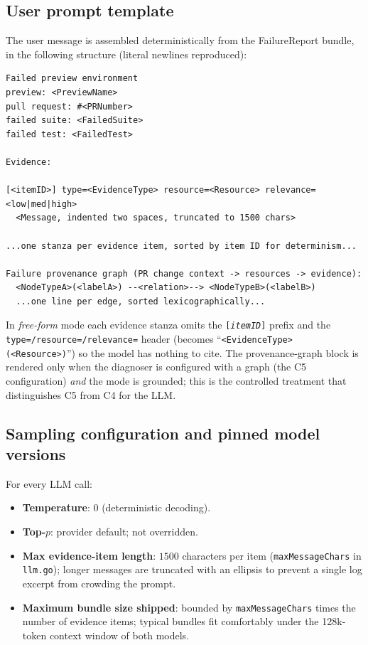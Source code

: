 \documentclass[sigconf, nonacm=true, anonymous=false, review=false]{acmart}
\newcommand{\fp}{FailureReport\xspace}
\newcommand{\Cn}[1]{C#1\xspace}
\begin{document}
\subsection{User prompt template}

The user message is assembled deterministically from the
\fp{} bundle, in the following structure (literal newlines reproduced):

\begin{lstlisting}
Failed preview environment
preview: <PreviewName>
pull request: #<PRNumber>
failed suite: <FailedSuite>
failed test: <FailedTest>

Evidence:

[<itemID>] type=<EvidenceType> resource=<Resource> relevance=<low|med|high>
  <Message, indented two spaces, truncated to 1500 chars>

...one stanza per evidence item, sorted by item ID for determinism...

Failure provenance graph (PR change context -> resources -> evidence):
  <NodeTypeA>(<labelA>) --<relation>--> <NodeTypeB>(<labelB>)
  ...one line per edge, sorted lexicographically...
\end{lstlisting}

In \emph{free-form} mode each evidence stanza omits the
\texttt{[\textit{itemID}]} prefix and the
\texttt{type=/resource=/relevance=} header (becomes
``\texttt{<EvidenceType> (<Resource>)}'') so the model has nothing
to cite. The provenance-graph block is rendered only when the
diagnoser is configured with a graph (the \Cn{5} configuration)
\emph{and} the mode is grounded; this is the controlled treatment
that distinguishes \Cn{5} from \Cn{4} for the LLM.

\subsection{Sampling configuration and pinned model versions}

For every LLM call:

\begin{itemize}
  \item \textbf{Temperature}: $0$ (deterministic decoding).
  \item \textbf{Top-$p$}: provider default; not overridden.
  \item \textbf{Max evidence-item length}: $1500$ characters per
    item (\texttt{maxMessageChars} in \texttt{llm.go}); longer
    messages are truncated with an ellipsis to prevent a single
    log excerpt from crowding the prompt.
  \item \textbf{Maximum bundle size shipped}: bounded by
    \texttt{maxMessageChars} times the number of evidence items;
    typical bundles fit comfortably under the 128k-token context
    window of both models.
\end{itemize}
\end{document}

